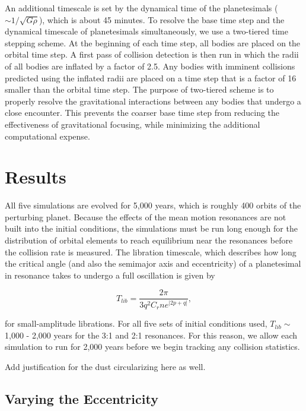 \documentclass[onecolumn]{aastex63}
\begin{document}
An additional timescale is set by the dynamical time of the planetesimals ($\sim 1/\sqrt{G \rho}$), which is about 45 minutes. To 
resolve the base time step and the dynamical timescale of planetesimals simultaneously, we use a two-tiered time stepping scheme. 
At the beginning of each time step, all bodies are placed on the orbital time step. A first pass of collision detection is then run in 
which the radii of all bodies are inflated by a factor of 2.5. Any bodies with imminent collisions predicted using the inflated radii are 
placed on a time step that is a factor of 16 smaller than the orbital time step. The purpose of two-tiered scheme is to properly resolve 
the gravitational interactions between any bodies that undergo a close encounter. This prevents the coarser base time step from 
reducing the effectiveness of gravitational focusing, while minimizing the additional computational expense.

\section{Results} \label{sec:results}

All five simulations are evolved for 5,000 years, which is roughly 400 orbits of the perturbing planet. Because the effects of the mean motion resonances are not built into the initial conditions, the simulations must be run long enough for the distribution of orbital elements to reach equilibrium near the resonances before the collision rate is measured. The libration timescale, which describes how long the critical angle (and also the semimajor axis and eccentricity) of a planetesimal in resonance takes to undergo a full oscillation is given by

\begin{equation}\label{eq:lib_time}
	T_{lib} = \frac{2 \pi}{3 q^{2} C_{r} n e^{\left| 2p + q \right|}},
\end{equation}

\noindent for small-amplitude librations. For all five sets of initial conditions used, $T_{lib} \sim$ 1,000 - 2,000 years for the 3:1 and 2:1 resonances. For this reason, we allow each simulation to run for 2,000 years before we begin tracking any collision statistics.

Add justification for the dust circularizing here as well.

\subsection{Varying the Eccentricity}
\end{document}
